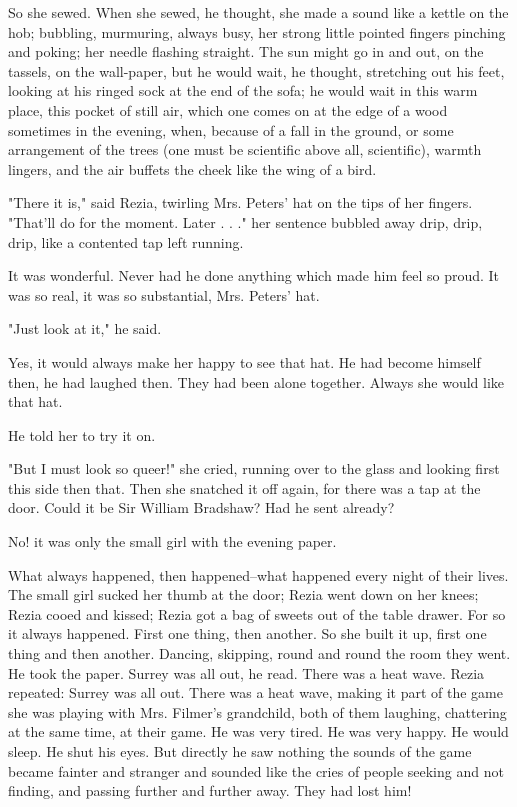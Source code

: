 \documentclass[lang=cn,10pt]{elegantbook}
\begin{document}
So she sewed.  When she sewed, he thought, she made a sound like a
kettle on the hob; bubbling, murmuring, always busy, her strong
little pointed fingers pinching and poking; her needle flashing
straight.  The sun might go in and out, on the tassels, on the
wall-paper, but he would wait, he thought, stretching out his feet,
looking at his ringed sock at the end of the sofa; he would wait in
this warm place, this pocket of still air, which one comes on at
the edge of a wood sometimes in the evening, when, because of a
fall in the ground, or some arrangement of the trees (one must be
scientific above all, scientific), warmth lingers, and the air
buffets the cheek like the wing of a bird.

"There it is," said Rezia, twirling Mrs. Peters' hat on the tips of
her fingers.  "That'll do for the moment.  Later . . ." her
sentence bubbled away drip, drip, drip, like a contented tap left
running.

It was wonderful.  Never had he done anything which made him feel
so proud.  It was so real, it was so substantial, Mrs. Peters' hat.

"Just look at it," he said.

Yes, it would always make her happy to see that hat.  He had become
himself then, he had laughed then.  They had been alone together.
Always she would like that hat.

He told her to try it on.

"But I must look so queer!" she cried, running over to the glass
and looking first this side then that.  Then she snatched it off
again, for there was a tap at the door.  Could it be Sir William
Bradshaw?  Had he sent already?

No! it was only the small girl with the evening paper.

What always happened, then happened--what happened every night of
their lives.  The small girl sucked her thumb at the door; Rezia
went down on her knees; Rezia cooed and kissed; Rezia got a bag of
sweets out of the table drawer.  For so it always happened.  First
one thing, then another.  So she built it up, first one thing and
then another.  Dancing, skipping, round and round the room they
went.  He took the paper.  Surrey was all out, he read.  There was
a heat wave.  Rezia repeated:  Surrey was all out.  There was a
heat wave, making it part of the game she was playing with Mrs.
Filmer's grandchild, both of them laughing, chattering at the same
time, at their game.  He was very tired.  He was very happy.  He
would sleep.  He shut his eyes.  But directly he saw nothing the
sounds of the game became fainter and stranger and sounded like the
cries of people seeking and not finding, and passing further and
further away.  They had lost him!
\end{document}
